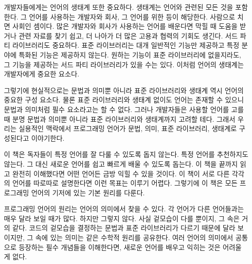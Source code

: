 개발자들에게는 언어의 생태계 또한 중요하다. 생태계는 언어와 관련된 모든 것을
포함한다. 그 언어를 사용하는 개발자와 회사, 그 언어를 위한
 등이 해당한다. 사람으로 치면 사회인 셈이다. 많은
개발자와 회사가 사용하는 언어를 배운다면 막힐 때 도움을 받거나 관련 자료를 찾기
쉽고, 더 나아가 더 많은 고용과 협력의 기회도 생긴다. 서드 파티 라이브러리도
중요하다. 표준 라이브러리는 대개 일반적인 기능만 제공하고 특정 분야에 특화된
기능은 제공하지 않는다. 원하는 기능이 표준 라이브러리에 없을지라도, 그 기능을
제공하는 서드 파티 라이브러리가 있을 수는 있다. 이처럼 언어의 생태계는
개발자에게 중요한 요소다.

그렇기에 현실적으로는 문법과 의미뿐 아니라 표준 라이브러리와 생태계 역시 언어의
중요한 구성 요소다. 물론 표준 라이브러리와 생태계 없이도 언어는 존재할 수 있으니
문법과 의미처럼 필수 요소라고는 할 수 없다. 그러나 개발자들은 사용할 언어를 고를
때 분명 문법과 의미뿐 아니라 표준 라이브러리와 생태계까지 고려할 테다. 그래서
우리는 실용적인 맥락에서 프로그래밍 언어가 문법, 의미, 표준 라이브러리, 생태계로
구성된다고 이야기한다.

이 책은 독자들이 특정 언어를 잘 다룰 수 있도록 돕지 않는다. 특정 언어를
추천하지도 않는다. 그 대신 새로운 언어를 쉽고 빠르게 배울 수 있도록 돕는다. 이
책을 끝까지 읽고 완전히 이해했다면 어떤 언어든 금방 익힐 수 있을 것이다. 이 책이
서로 다른 각각의 언어를 따로따로 설명한다면 이런 목표는 이루기 어렵다. 그렇기에
이 책은 모든 프로그래밍 언어의 기저에 있는 기본 원리를 다룬다.

프로그래밍 언어의 원리는 언어의 의미에서 찾을 수 있다. 각 언어가 다른 언어들과는
매우 달라 보일 때가 많다. 하지만 그렇지 않다. 사실 겉모습이 다를 뿐이지, 그 속은
거의 같다. 코드의 겉모습을 결정하는 문법과 표준 라이브러리가 다르기 때문에 달라
보이지만, 그 속에 있는 의미는 같은 수학적 원리를 공유한다. 여러 언어의 의미에서
공통으로 등장하는 필수 개념들을 이해한다면, 새로운 언어를 배우고 익히는 것은
어려울 게 없다.

